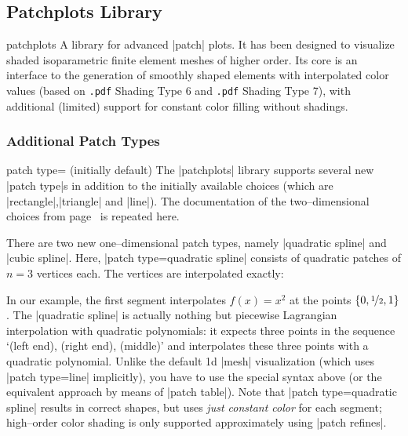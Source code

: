 \subsection{Patchplots Library}
\label{sec:lib:patchplots}
\begin{pgfplotslibrary}{patchplots}
	A library for advanced |patch| plots. It has been designed to visualize shaded isoparametric finite element meshes of higher order. Its core is an interface to the generation of smoothly shaped elements with interpolated color values (based on \texttt{.pdf} Shading Type 6 and \texttt{.pdf} Shading Type 7), with additional (limited) support for constant color filling without shadings.

\subsubsection{Additional Patch Types}
%
\begin{pgfplotskey}{patch type= (initially default)}
	The |patchplots| library supports several new |patch type|s in addition to the initially available choices (which are |rectangle|,|triangle| and |line|). The documentation of the two--dimensional choices from page~\pageref{key:patch:type} is repeated here.

	There are two new one--dimensional patch types, namely |quadratic spline| and |cubic spline|. Here, |patch type=quadratic spline| consists of quadratic patches of $n=3$ vertices each. The vertices are interpolated exactly:
\begin{codeexample}[]
\end{codeexample}
	\noindent In our example, the first segment interpolates $f(x)=x^2$ at the points $\{0,\nicefrac12,1\}$. The |quadratic spline| is actually nothing but piecewise Lagrangian interpolation with quadratic polynomials: it expects three points in the sequence `(left end), (right end), (middle)' and interpolates these three points with a quadratic polynomial. Unlike the default 1d |mesh| visualization (which uses |patch type=line| implicitly), you have to use the special syntax above (or the equivalent approach by means of |patch table|). Note that |patch type=quadratic spline| results in correct shapes, but uses \emph{just constant color} for each segment; high--order color shading is only supported approximately using |patch refines|.


\end{pgfplotskey}
\end{pgfplotslibrary}
